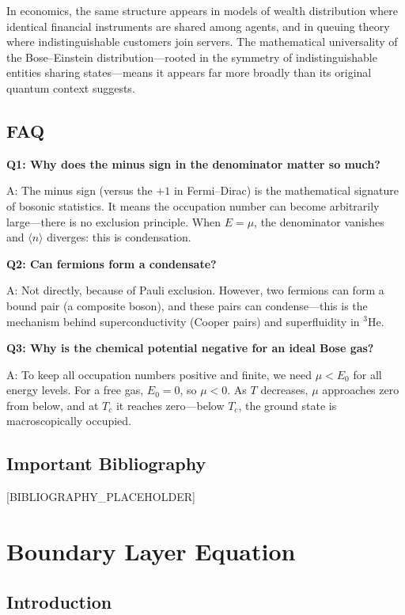 \documentclass[11pt,openright]{book}
\begin{document}
In economics, the same structure appears in models of wealth distribution where identical financial instruments are shared among agents, and in queuing theory where indistinguishable customers join servers. The mathematical universality of the Bose--Einstein distribution---rooted in the symmetry of indistinguishable entities sharing states---means it appears far more broadly than its original quantum context suggests.


\section*{FAQ}

\textbf{Q1: Why does the minus sign in the denominator matter so much?}

A: The minus sign (versus the $+1$ in Fermi--Dirac) is the mathematical signature of bosonic statistics. It means the occupation number can become arbitrarily large---there is no exclusion principle. When $E = \mu$, the denominator vanishes and $\langle n \rangle$ diverges: this is condensation.

\textbf{Q2: Can fermions form a condensate?}

A: Not directly, because of Pauli exclusion. However, two fermions can form a bound pair (a composite boson), and these pairs can condense---this is the mechanism behind superconductivity (Cooper pairs) and superfluidity in $^3$He.

\textbf{Q3: Why is the chemical potential negative for an ideal Bose gas?}

A: To keep all occupation numbers positive and finite, we need $\mu < E_0$ for all energy levels. For a free gas, $E_0 = 0$, so $\mu < 0$. As $T$ decreases, $\mu$ approaches zero from below, and at $T_c$ it reaches zero---below $T_c$, the ground state is macroscopically occupied.
\section*{Important Bibliography}

[BIBLIOGRAPHY_PLACEHOLDER]


\chapter{Boundary Layer Equation}

\section*{Introduction}
\end{document}
